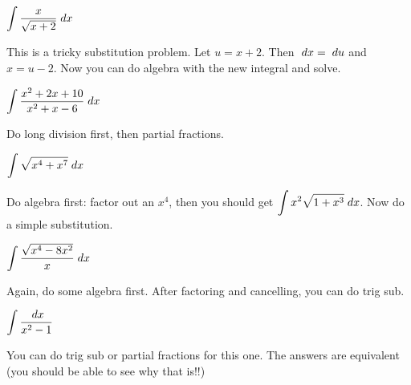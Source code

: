 \documentclass{ximera}
\theoremstyle{definition}
\newcommand{\du}{\; du}
\begin{document}
\begin{problem}
$\displaystyle \int \displaystyle\frac{x}{\sqrt{x + 2}} \; dx$
\begin{multipleChoice}
\end{multipleChoice}
\begin{feedback}[correct]
This is a tricky substitution problem. Let $u=x+2$. Then $\dx = \du$ and $x = u-2$. Now you can do algebra with the new integral and solve.
\end{feedback}
\end{problem}
\begin{problem}
$\displaystyle \int \displaystyle\frac{x^2 + 2x + 10}{x^2 + x - 6} \; dx$
\begin{multipleChoice}
\end{multipleChoice}
\begin{feedback}[correct]
 Do long division first, then partial fractions.
\end{feedback}
\end{problem}
\begin{problem}
$ \displaystyle \int \sqrt{x^4 + x^7} \; dx$
\begin{multipleChoice}
\end{multipleChoice}
\begin{feedback}[correct]
Do algebra first: factor out an $x^4$, then you should get $\displaystyle \int x^2\sqrt{1+x^3} \; dx$. Now do a simple substitution.
\end{feedback}
\end{problem}
\begin{problem}
$\displaystyle \int \displaystyle\frac{\sqrt{x^4 - 8x^2}}{x} \; dx$
\begin{multipleChoice}
\end{multipleChoice}
\begin{feedback}[correct]
Again, do some algebra first. After factoring and cancelling, you can do trig sub.
\end{feedback}
\end{problem}
\begin{problem}
$\displaystyle \int \displaystyle\frac{\; dx}{x^2-1}$
\begin{multipleChoice}
\end{multipleChoice}
\begin{feedback}[correct]
You can do trig sub or partial fractions for this one. The answers are equivalent (you should be able to see why that is!!)
\end{feedback}
\end{problem}
\end{document}
